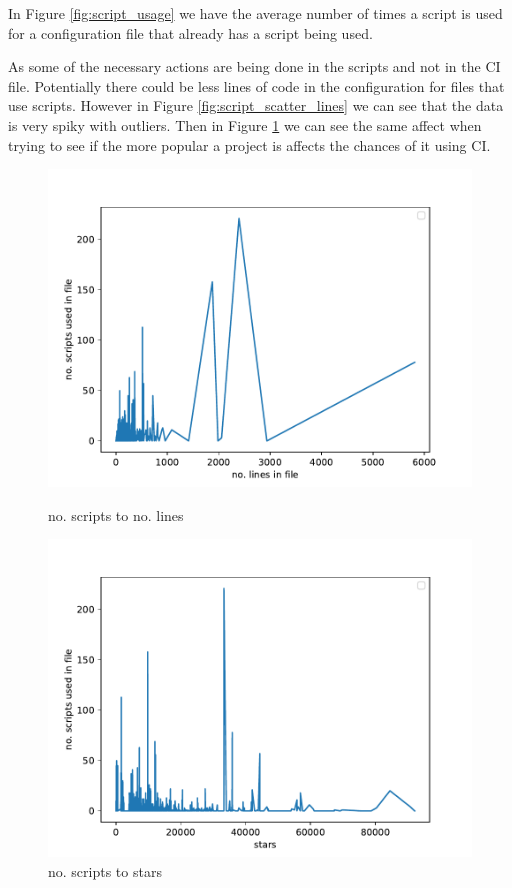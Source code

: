 \documentclass[twoside,12pt,titlepage,a4paper]{article}
\begin{document}
In Figure \ref{fig:script_usage} we have the average number of times a script is used for a configuration file that already has a script being used.

As some of the necessary actions are being done in the scripts and not in the CI file. Potentially there could be less lines of code in the configuration for files that use scripts. However in Figure \ref{fig:script_scatter_lines} we can see that the data is very spiky with outliers. Then in Figure \ref{fig:script_scatter_lines2} we can see the same affect when trying to see if the more popular a project is affects the chances of it using CI.

\begin{figure}[!ht]
  \centering
  \begin{minipage}[!t]{.48\textwidth}
    \includegraphics[width=\textwidth]{../src/results/scripts vs lines.pdf}
    \caption{no. scripts to no. lines}
    \label{fig:script_scatter_lines}    
  \end{minipage}%
  \hfill
  \begin{minipage}[!t]{.48\textwidth}
    \includegraphics[width=\textwidth]{../src/results/scripts vs stars.pdf}
    \caption{no. scripts to stars}
    \label{fig:script_scatter_lines2}
  \end{minipage}
\end{figure}
\end{document}
